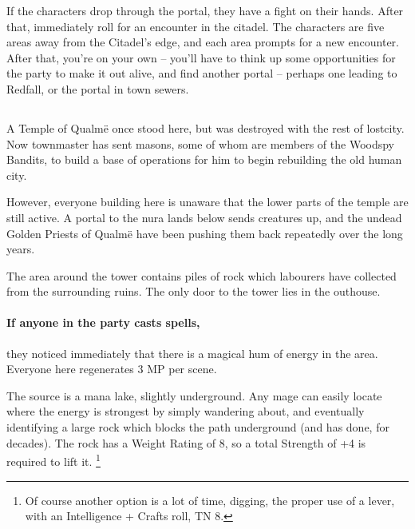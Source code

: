 \begin{multicols}{2}
If the characters drop through the portal, they have a fight on their hands.
After that, immediately roll for an encounter in the citadel.
The characters are five areas away from the Citadel's edge, and each area prompts for a new encounter.
After that, you're on your own -- you'll have to think up some opportunities for the party to make it out alive, and find another portal -- perhaps one leading to Redfall, or the portal in \gls{town} sewers.

\subsection{}
\label{green_tower}
\setcounter{list}{0}


A Temple of Qualm\"{e} once stood here, but was destroyed with the rest of \gls{lostcity}.
Now \gls{townmaster} has sent masons, some of whom are members of the Woodspy Bandits, to build a base of operations for him to begin rebuilding the old human city.

However, everyone building here is unaware that the lower parts of the temple are still active.
A portal to the nura lands below sends creatures up, and the undead Golden Priests of Qualm\"{e} have been pushing them back repeatedly over the long years.


The area around the tower contains piles of rock which labourers have collected from the surrounding ruins.  The only door to the tower lies in the outhouse.

\paragraph{If anyone in the party casts spells,}
they noticed immediately that there is a magical hum of energy in the area.
Everyone here regenerates 3 MP per scene.

The source is a mana lake, slightly underground.
Any mage can easily locate where the energy is strongest by simply wandering about, and eventually identifying a large rock which blocks the path underground (and has done, for decades).
The rock has a Weight Rating of 8, so a total Strength of +4 is required to lift it.%
\footnote{Of course another option is a lot of time, digging, the proper use of a lever, with an Intelligence + Crafts roll, TN 8.}



\end{multicols}
